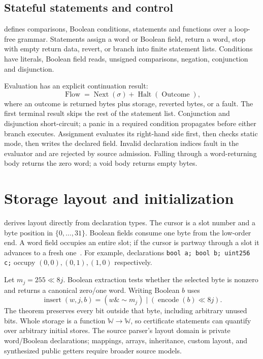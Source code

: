 \documentclass[conference]{IEEEtran}
\newcommand{\W}{\mathbb W}
\newcommand{\code}[1]{\texttt{#1}}
\begin{document}
\subsection{Stateful statements and control}
 defines comparisons, Boolean conditions,
statements and functions over a loop-free grammar. Statements assign a word or
Boolean field, return a word, stop with empty return data, revert, or branch
into finite statement lists. Conditions have literals, Boolean field reads,
unsigned comparisons, negation, conjunction and disjunction.

Evaluation has an explicit continuation result:
\[
 \operatorname{Flow}=\operatorname{Next}(\sigma)
 +\operatorname{Halt}(\operatorname{Outcome}),
\]
where an outcome is returned bytes plus storage, reverted bytes, or a fault.
The first terminal result skips the rest of the statement list. Conjunction
and disjunction short-circuit; a panic in a required condition propagates before
either branch executes. Assignment evaluates its right-hand side first, then
checks static mode, then writes the declared field. Invalid declaration indices
fault in the evaluator and are rejected by source admission. Falling through
a word-returning body returns the zero word; a void body returns empty bytes.

\section{Storage layout and initialization}
 derives layout directly from declaration types.
The cursor is a slot number and a byte position in $\{0,\ldots,31\}$.
Boolean fields consume one byte from
the low-order end. A word field occupies an entire slot; if the cursor is
partway through a slot it advances to a fresh one~\cite{layout}.
For example, declarations \code{bool a; bool b; uint256 c;} occupy
$(0,0),(0,1),(1,0)$ respectively.

Let $m_j=255\ll 8j$. Boolean extraction tests whether the selected byte is
nonzero and returns a canonical zero/one word. Writing Boolean $b$ uses
\[
 \operatorname{insert}(w,j,b)=
 (w\mathbin{\&}{\sim}m_j)\mathbin{|}
 (\operatorname{encode}(b)\ll8j).
\]
The theorem  preserves every
bit outside that byte, including arbitrary unused bits. Whole storage is a
function $\W\to\W$, so certificate statements can quantify over arbitrary
initial stores. The source parser's layout domain is private word/Boolean
declarations; mappings, arrays, inheritance, custom layout, and synthesized
public getters require broader source models.
\end{document}
